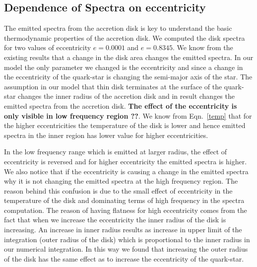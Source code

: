 \documentclass[useAMS,usenatbib]{mn2e}
\begin{document}
\subsection{Dependence of Spectra on eccentricity}
The emitted spectra from the accretion disk is key to understand the basic thermodynamic properties of the accretion disk. We computed the disk spectra for two values of eccentricity $e = 0.0001$ and $e = 0.8345$. We know from the existing results that a change in the disk area changes the emitted spectra. In our model the only parameter we changed is the eccentricity and since a change in the eccentricity of the quark-star is changing the semi-major axis of the star. The assumption in our model that thin disk terminates at the surface of the quark-star changes the inner radius of the accretion disk and in result changes the emitted spectra from the accretion disk. \textbf{The effect of the eccentricity is only visible in low frequency region ??}. We know from Eqn.~\ref{temp} that for the higher eccentricities the temperature of the disk is lower and hence emitted spectra in the inner region has lower value for higher eccentricities. 

In the low frequency range which is emitted at larger radius, the effect of eccentricity is reversed and for higher eccentricity the emitted spectra is higher. We also notice that if the eccentricity is causing a change in the emitted spectra why it is not changing the emitted spectra at the high frequency region. The reason behind this confusion is due to the small effect of eccentricity in the temperature of the disk and dominating terms of high frequency in the spectra computation. The reason of having flatness for high eccentricity comes from the fact that when we increase the eccentricity the inner radius of the disk is increasing. An increase in inner radius results as increase in upper limit of the integration (outer radius of the disk) which is proportional to the inner radius in our numerical integration. In this way we found that increasing the outer radius of the disk has the same effect as to increase the eccentricity of the quark-star.  

\end{document}

